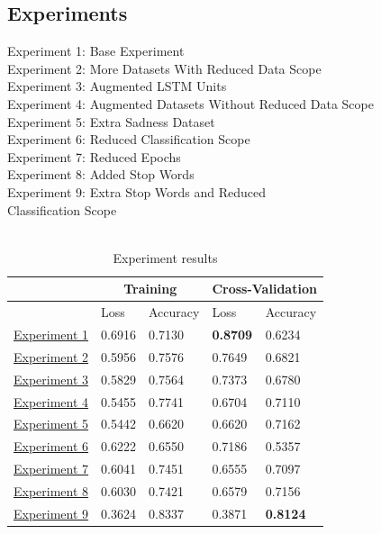 \documentclass[a4]{sciposter}
\begin{document}
\begin{multicols}{3}
\section{Experiments}
Experiment 1: Base Experiment\\
Experiment 2: More Datasets With Reduced Data Scope\\
Experiment 3: Augmented LSTM Units\\
Experiment 4: Augmented Datasets Without Reduced Data
Scope\\
Experiment 5: Extra Sadness Dataset\\
Experiment 6: Reduced Classification Scope\\
Experiment 7: Reduced Epochs\\
Experiment 8: Added Stop Words\\
Experiment 9: Extra Stop Words and Reduced\\ Classification Scope\\ \\
\begin{table}[!h]
	\captionsetup{type=table}
	\setcounter{table}{1}
	\caption{Experiment results}
	\vspace{0.5cm}
	\centering
	\begin{tabular}[t]{|l|l|l|l|l|}
	\hline
	\multicolumn{1}{|c|}{} & \multicolumn{2}{c|}{Training} & \multicolumn{2}{c|}{Cross-Validation}
	\\ \hline
	\ & Loss & Accuracy & Loss & Accuracy
	\\ \hline
	\hyperref[exp1]{Experiment 1} & 0.6916 & 0.7130 & \textbf{0.8709} & 0.6234
	\\ \hline
	\hyperref[exp2]{Experiment 2} & 0.5956 & 0.7576 & 0.7649 & 0.6821
	\\ \hline
	\hyperref[exp3]{Experiment 3} & 0.5829 & 0.7564 & 0.7373 & 0.6780
	\\ \hline
	\hyperref[exp4]{Experiment 4} & 0.5455 & 0.7741 & 0.6704 & 0.7110
	\\ \hline
	\hyperref[exp5]{Experiment 5} & 0.5442 & 0.6620 & 0.6620 & 0.7162
	\\ \hline
	\hyperref[exp6]{Experiment 6} & 0.6222 & 0.6550 & 0.7186 & 0.5357
	\\ \hline
	\hyperref[exp7]{Experiment 7} & 0.6041 & 0.7451 & 0.6555 & 0.7097
	\\ \hline
	\hyperref[exp8]{Experiment 8} & 0.6030 & 0.7421 & 0.6579 & 0.7156
	\\ \hline
	\hyperref[exp9]{Experiment 9} & 0.3624 & 0.8337 & 0.3871 & \textbf{0.8124}
	\\ \hline
	\end{tabular}
\end{table}


\end{multicols}
\end{document}
